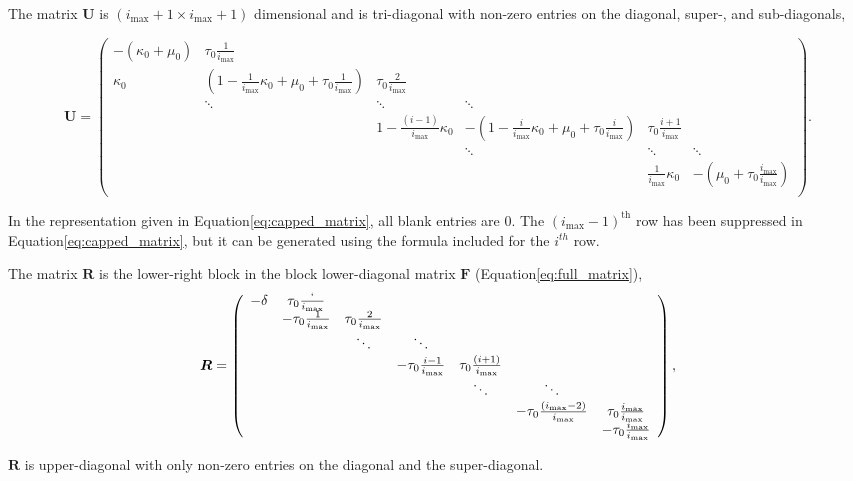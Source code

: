 \documentclass[a4,center,fleqn]{NAR}
\newcommand{\imax}{\ensuremath{{i_{\max}}}\xspace}
\let\bs\boldsymbol
\begin{document}
The matrix $\bs{U}$ is $(\imax+1\times \imax+1)$ dimensional and is tri-diagonal with non-zero entries on the diagonal, super-, and sub-diagonals,
\pagebreak
\begin{strip}
\begin{equation}
\bs{U}=\left(\begin{array}{cccccc}
-(\kappa_0+\mu_0) & \tau_0\frac{1}{\imax} &  &  &  & \\
\kappa_0 & \left(1-\frac{1}{\imax} \kappa_0+\mu_0+\tau_0\frac{1}{\imax}\right) & \tau_0\frac{2}{\imax} &  &  & \\
   &\ddots        & \ddots        & \ddots & &  \\
   & &    1-\frac{(i-1)}{\imax}\kappa_0 & -\left(1-\frac{i}{\imax}\kappa_0+\mu_0+\tau_0\frac{i}{\imax}\right) & \tau_0\frac{i+1}{\imax} & \\
                  &         &        & \ddots  & \ddots & \ddots \\
     
                          &        &  &  & \frac{1}{\imax}\kappa_0 & -\left(\mu_0+\tau_0\frac{\imax}{\imax}\right) \\
\end{array}\right).
\end{equation}

In the representation given in Equation\ref{eq:capped_matrix}, all blank entries are 0.
The $(\imax-1)^{\text{th}}$ row has been suppressed in Equation\ref{eq:capped_matrix}, but it can be generated using the formula included for the $i^{th}$ row.

The matrix $\bs{R}$ is the lower-right block in the block lower-diagonal matrix $\bs{F}$ (Equation\ref{eq:full_matrix}),
\begin{equation}
\bs{R}=\left(
\begin{array}{ccccccc}
-\delta & \tau_0\frac{`}{\imax} & & & & & \\
 & -\tau_0\frac{1}{\imax} & \tau_0\frac{2}{\imax} & & & &\\
 & & \ddots & \ddots & & & \\
 & & & -\tau_0\frac{i-1}{\imax} & \tau_0\frac{(i+1)}{\imax} & & \\
 & & & & \ddots & \ddots & \\
 & & & & & -\tau_0\frac{(\imax-2)}{\imax} & \tau_0\frac{\imax}{\imax} \\
 & & & & & & -\tau_0\frac{\imax}{\imax} \\
\end{array}
\right),
\end{equation}
\end{strip}
$\bs{R}$ is upper-diagonal with only non-zero entries on the diagonal and the super-diagonal.
\end{document}

